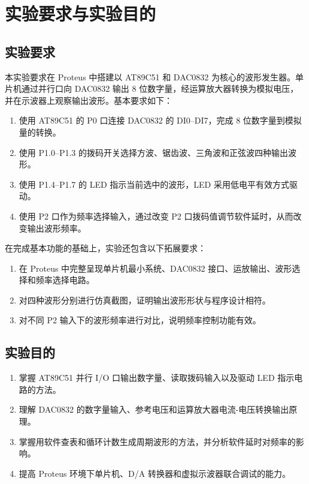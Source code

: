\section{实验要求与实验目的}

\subsection{实验要求}
本实验要求在 Proteus 中搭建以 AT89C51 和 DAC0832 为核心的波形发生器。单片机通过并行口向 DAC0832 输出 8 位数字量，经运算放大器转换为模拟电压，并在示波器上观察输出波形。基本要求如下：
\begin{enumerate}
  \item 使用 AT89C51 的 P0 口连接 DAC0832 的 DI0--DI7，完成 8 位数字量到模拟量的转换。
  \item 使用 P1.0--P1.3 的拨码开关选择方波、锯齿波、三角波和正弦波四种输出波形。
  \item 使用 P1.4--P1.7 的 LED 指示当前选中的波形，LED 采用低电平有效方式驱动。
  \item 使用 P2 口作为频率选择输入，通过改变 P2 口拨码值调节软件延时，从而改变输出波形频率。
\end{enumerate}

在完成基本功能的基础上，实验还包含以下拓展要求：
\begin{enumerate}
  \item 在 Proteus 中完整呈现单片机最小系统、DAC0832 接口、运放输出、波形选择和频率选择电路。
  \item 对四种波形分别进行仿真截图，证明输出波形形状与程序设计相符。
  \item 对不同 P2 输入下的波形频率进行对比，说明频率控制功能有效。
\end{enumerate}

\subsection{实验目的}
\begin{enumerate}
  \item 掌握 AT89C51 并行 I/O 口输出数字量、读取拨码输入以及驱动 LED 指示电路的方法。
  \item 理解 DAC0832 的数字量输入、参考电压和运算放大器电流-电压转换输出原理。
  \item 掌握用软件查表和循环计数生成周期波形的方法，并分析软件延时对频率的影响。
  \item 提高 Proteus 环境下单片机、D/A 转换器和虚拟示波器联合调试的能力。
\end{enumerate}

